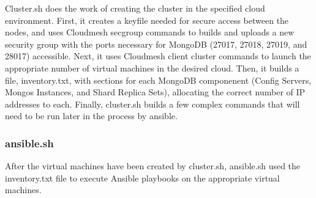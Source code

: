 \documentclass[9pt,twocolumn,twoside]{../../styles/osajnl}
\begin{document}
Cluster.sh does the work of creating the cluster in the specified cloud environment.  First, it creates a keyfile needed for secure access between the nodes, and uses Cloudmesh secgroup commands to builds and uploads a new security group with the ports necessary for MongoDB (27017, 27018, 27019, and 28017) accessible.  Next, it uses Cloudmesh client cluster commands to launch the appropriate number of virtual machines in the desired cloud.  Then, it builds a file, inventory.txt, with sections for each MongoDB componenent (Config Servers, Mongos Instances, and Shard Replica Sets), allocating the correct number of IP addresses to each.  Finally, cluster.sh builds a few complex commands that will need to be run later in the process by ansible.

\subsubsection{ansible.sh}

After the virtual machines have been created by cluster.sh, ansible.sh used the inventory.txt file to execute Ansible playbooks on the appropriate virtual machines.
\end{document}
